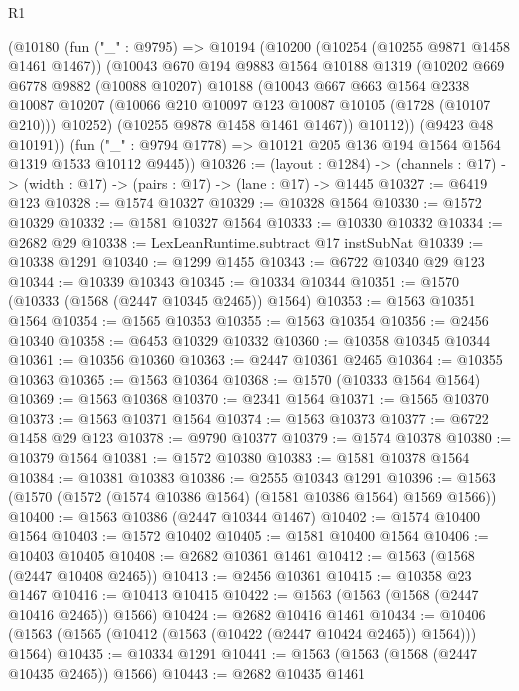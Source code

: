 \begin{lexlean}{R1}
\begin{coremodule}
    (@10180
      (fun ("_" : @9795) =>
      @10194
        (@10200
          (@10254 (@10255 @9871 @1458 @1461 @1467))
          (@10043
            @670
            @194
            @9883
            @1564
            @10188
            @1319
            (@10202
              @669
              @6778
              @9882
              (@10088 @10207)
              @10188
              (@10043
                @667
                @663
                @1564
                @2338
                @10087
                @10207
                (@10066 @210 @10097 @123 @10087 @10105 (@1728 (@10107 @210)))
                @10252)
              (@10255 @9878 @1458 @1461 @1467))
            @10112))
        (@9423 @48 @10191))
      (fun ("_" : @9794 @1778) => @10121 @205 @136 @194 @1564 @1564 @1319 @1533 @10112 @9445))
@10326 := (layout : @1284) ->
  (channels : @17) -> (width : @17) -> (pairs : @17) -> (lane : @17) -> @1445
@10327 := @6419 @123
@10328 := @1574 @10327
@10329 := @10328 @1564
@10330 := @1572 @10329
@10332 := @1581 @10327 @1564
@10333 := @10330 @10332
@10334 := @2682 @29
@10338 := LexLeanRuntime.subtract @17 instSubNat
@10339 := @10338 @1291
@10340 := @1299 @1455
@10343 := @6722 @10340 @29 @123
@10344 := @10339 @10343
@10345 := @10334 @10344
@10351 := @1570 (@10333 (@1568 (@2447 @10345 @2465)) @1564)
@10353 := @1563 @10351 @1564
@10354 := @1565 @10353
@10355 := @1563 @10354
@10356 := @2456 @10340
@10358 := @6453 @10329 @10332
@10360 := @10358 @10345 @10344
@10361 := @10356 @10360
@10363 := @2447 @10361 @2465
@10364 := @10355 @10363
@10365 := @1563 @10364
@10368 := @1570 (@10333 @1564 @1564)
@10369 := @1563 @10368
@10370 := @2341 @1564
@10371 := @1565 @10370
@10373 := @1563 @10371 @1564
@10374 := @1563 @10373
@10377 := @6722 @1458 @29 @123
@10378 := @9790 @10377
@10379 := @1574 @10378
@10380 := @10379 @1564
@10381 := @1572 @10380
@10383 := @1581 @10378 @1564
@10384 := @10381 @10383
@10386 := @2555 @10343 @1291
@10396 := @1563 (@1570 (@1572 (@1574 @10386 @1564) (@1581 @10386 @1564) @1569 @1566))
@10400 := @1563 @10386 (@2447 @10344 @1467)
@10402 := @1574 @10400 @1564
@10403 := @1572 @10402
@10405 := @1581 @10400 @1564
@10406 := @10403 @10405
@10408 := @2682 @10361 @1461
@10412 := @1563 (@1568 (@2447 @10408 @2465))
@10413 := @2456 @10361
@10415 := @10358 @23 @1467
@10416 := @10413 @10415
@10422 := @1563 (@1563 (@1568 (@2447 @10416 @2465)) @1566)
@10424 := @2682 @10416 @1461
@10434 := @10406 (@1563 (@1565 (@10412 (@1563 (@10422 (@2447 @10424 @2465)) @1564))) @1564)
@10435 := @10334 @1291
@10441 := @1563 (@1563 (@1568 (@2447 @10435 @2465)) @1566)
@10443 := @2682 @10435 @1461

\end{coremodule}
\end{lexlean}
